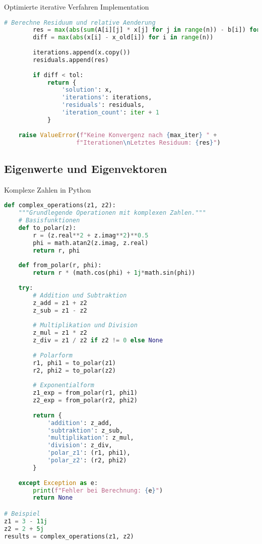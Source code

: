 \begin{examplecode}{Optimierte iterative Verfahren Implementation}
\begin{lstlisting}[language=Python, style=basesmol]
        # Berechne Residuum und relative Aenderung
        res = max(abs(sum(A[i][j] * x[j] for j in range(n)) - b[i]) for i in range(n))
        diff = max(abs(x[i] - x_old[i]) for i in range(n))
        
        iterations.append(x.copy())
        residuals.append(res)
        
        if diff < tol:
            return {
                'solution': x,
                'iterations': iterations,
                'residuals': residuals,
                'iteration_count': iter + 1
            }
            
    raise ValueError(f"Keine Konvergenz nach {max_iter} " + 
                    f"Iterationen\nLetztes Residuum: {res}")
\end{lstlisting}
\end{examplecode}

\subsection{Eigenwerte und Eigenvektoren}



\begin{examplecode}{Komplexe Zahlen in Python}
\begin{lstlisting}[language=Python, style=basesmol]
def complex_operations(z1, z2):
    """Grundlegende Operationen mit komplexen Zahlen."""
    # Basisfunktionen
    def to_polar(z):
        r = (z.real**2 + z.imag**2)**0.5
        phi = math.atan2(z.imag, z.real)
        return r, phi
    
    def from_polar(r, phi):
        return r * (math.cos(phi) + 1j*math.sin(phi))
    
    try:
        # Addition und Subtraktion
        z_add = z1 + z2
        z_sub = z1 - z2
        
        # Multiplikation und Division
        z_mul = z1 * z2
        z_div = z1 / z2 if z2 != 0 else None
        
        # Polarform
        r1, phi1 = to_polar(z1)
        r2, phi2 = to_polar(z2)
        
        # Exponentialform
        z1_exp = from_polar(r1, phi1)
        z2_exp = from_polar(r2, phi2)
        
        return {
            'addition': z_add,
            'subtraktion': z_sub,
            'multiplikation': z_mul,
            'division': z_div,
            'polar_z1': (r1, phi1),
            'polar_z2': (r2, phi2)
        }
        
    except Exception as e:
        print(f"Fehler bei Berechnung: {e}")
        return None

# Beispiel
z1 = 3 - 11j
z2 = 2 + 5j
results = complex_operations(z1, z2)
\end{lstlisting}
\end{examplecode}

